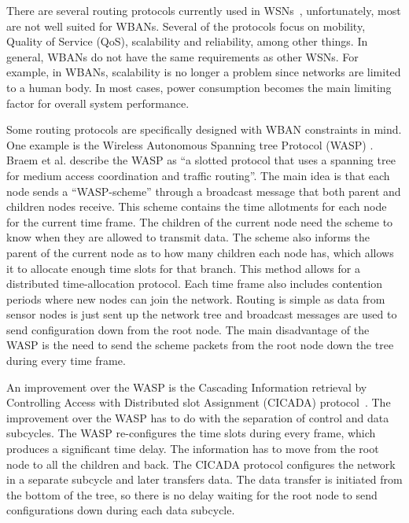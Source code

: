 There are several routing protocols currently used in WSNs~\cite{survey:wirelessrouting}, unfortunately, most are not well suited for WBANs. Several of the protocols focus on mobility, Quality of Service (QoS), scalability and reliability, among other things. In general, WBANs do not have the same requirements as other WSNs. For example, in WBANs, scalability is no longer a problem since networks are limited to a human body. In most cases, power consumption becomes the main limiting factor for overall system performance. 

Some routing protocols are specifically designed with WBAN constraints in mind. One example is the Wireless Autonomous Spanning tree Protocol (WASP) \cite{protocol:WASP}. Braem et al. describe the WASP as ``a slotted protocol that uses a spanning tree for medium access coordination and traffic routing''. The main idea is that each node sends a ``WASP-scheme'' through a broadcast message that both parent and children nodes receive. This scheme contains the time allotments for each node for the current time frame. The children of the current node need the scheme to know when they are allowed to transmit data. The scheme also informs the parent of the current node as to how many children each node has, which allows it to allocate enough time slots for that branch. This method allows for a distributed time-allocation protocol. Each time frame also includes contention periods where new nodes can join the network. Routing is simple as data from sensor nodes is just sent up the network tree and broadcast messages are used to send configuration down from the root node. The main disadvantage of the WASP is the need to send the scheme packets from the root node down the tree during every time frame.

An improvement over the WASP is the Cascading Information retrieval by Controlling Access with Distributed slot Assignment (CICADA) protocol~\cite{protocol:CICADA}. The improvement over the WASP has to do with the separation of control and data subcycles. The WASP re-configures the time slots during every frame, which produces a significant time delay. The information has to move from the root node to all the children and back. The CICADA protocol configures the network in a separate subcycle and later transfers data. The data transfer is initiated from the bottom of the tree, so there is no delay waiting for the root node to send configurations down during each data subcycle.

